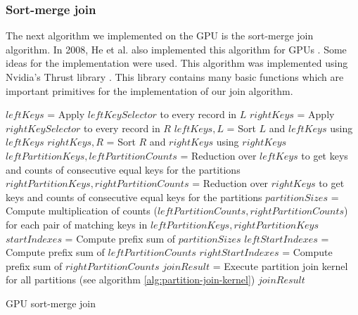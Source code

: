 \documentclass[a4paper,titlepage]{article}
\begin{document}
\subsubsection{Sort-merge join}
The next algorithm we implemented on the GPU is the sort-merge join algorithm. In 2008, He et al. also implemented this algorithm for GPUs \cite{he2008}. Some ideas for the implementation were used. This algorithm was implemented using Nvidia's Thrust library \cite{thrust}. This library contains many basic functions which are important primitives for the implementation of our join algorithm. 

\begin{algorithm}[ht]
 \label{alg:gpu-sort-merge-join}
 
 $leftKeys$ = Apply $leftKeySelector$ to every record in $L$\;
 $rightKeys$ = Apply $rightKeySelector$ to every record in $R$\;
 $leftKeys, L$ = Sort $L$ and $leftKeys$ using $leftKeys$ \;
 $rightKeys, R$ = Sort $R$ and $rightKeys$ using $rightKeys$ \;
 \;
 $leftPartitionKeys, leftPartitionCounts$ = Reduction over $leftKeys$ to get keys and counts of consecutive equal keys for the partitions \;
 $rightPartitionKeys, rightPartitionCounts$ = Reduction over $rightKeys$ to get keys and counts of consecutive equal keys for the partitions \;
 \;
 $partitionSizes$ = Compute multiplication of counts ($leftPartitionCounts, rightPartitionCounts$) for each pair of matching keys in $leftPartitionKeys, rightPartitionKeys$ \;
 \;
 $startIndexes$ = Compute prefix sum of $partitionSizes$ \;
 $leftStartIndexes$ = Compute prefix sum of $leftPartitionCounts$ \;
 $rightStartIndexes$ = Compute prefix sum of $rightPartitionCounts$ \;
 \;
 $joinResult$ = Execute partition join kernel for all partitions (see algorithm \ref{alg:partition-join-kernel})\;
 \Return $joinResult$ \;
 
 \caption{GPU sort-merge join}
\end{algorithm}
\end{document}

